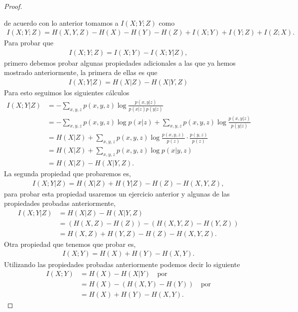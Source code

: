 \begin{enumerate}
\begin{proof}
\begin{center}
\begin{tikzpicture}[x=0.75pt,y=0.75pt,yscale=-1,xscale=1]
\end{tikzpicture}
        \end{center}
de acuerdo con lo anterior tomamos a $I(X;Y;Z)$ como
\begin{align*}
    I(X;Y;Z)=H(X,Y,Z)-H(X)-H(Y)-H(Z)+I(X;Y)+I(Y;Z)+I(Z;X).
\end{align*}
Para probar que
\begin{align*}
    I(X;Y;Z) = I(X;Y)-I(X;Y|Z),
\end{align*} 
primero debemos probar algunas propiedades adicionales a las que ya hemos mostrado anteriormente,
la primera de ellas es que 
\begin{align}
    I(X; Y |Z) = H(X|Z)-H(X|Y,Z)
\end{align}
Para esto seguimos los siguientes cálculos
\begin{align*}
I(X; Y | Z) &= - \sum_{x,y,z} p(x, y, z) \log \frac{p(x, y | z)}{p(x | z) p(y | z)} \\
&= - \sum_{x,y,z} p(x, y, z) \log p(x | z) + \sum_{x,y,z} p(x, y, z) \log \frac{p(x, y | z)}{p(y |z)} \\
&= H(X|Z) + \sum_{x,y,z} p(x, y, z) \log \frac{p(x, y, z)}{p(z)} \cdot \frac{ p(y, z)}{p(z)} \\
&= H(X|Z) + \sum_{x,y,z} p(x, y, z) \log p(x | y, z) \\
&= H(X|Z) - H(X|Y, Z).
\end{align*}
La segunda propiedad que probaremos es,
\begin{align}
    I(X; Y |Z) = H(X|Z) + H(Y |Z) - H(Z) -H(X, Y,Z),
\end{align}
 para probar esta propiedad usaremos un ejercicio anterior y algunas de las propiedades probadas anteriormente,
 \begin{align*}
I(X; Y | Z) &= H(X | Z) - H(X | Y, Z)  \\
&= (H(X, Z) - H(Z)) - (H(X, Y, Z) - H(Y, Z)) \\
&= H(X, Z) + H(Y, Z) - H(Z) - H(X, Y, Z).
\end{align*}
Otra propiedad que tenemos que probar es,
\begin{align}
    I(X; Y ) = H(X) + H(Y ) -H(X, Y ).
\end{align}
Utilizando las propiedades probadas anteriormente podemos decir lo siguiente
\begin{align*}
I(X; Y) &= H(X) - H(X | Y) \quad \text{por} \\
&= H(X) - (H(X, Y) - H(Y)) \quad \text{por}  \\
&= H(X) + H(Y) - H(X, Y).
\end{align*}


\end{proof}
\end{enumerate}
